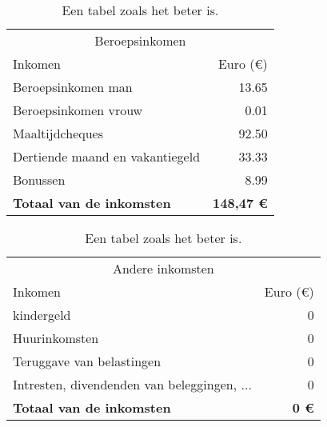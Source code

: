\begin{comment}
		&                                                                      \\ \hline
		\textbf{Totaal van de inkomsten}              & \textbf{1535 \euro{}}   \\ %
		
		
	\end{tabular}
	\caption{budget}
	\label{tab:budgetoverzicht}
\end{table}

\end{comment}

\begin{table}[!htbp]
	\centering
	\begin{tabular}{@{}lr@{}} \toprule
		\multicolumn{2}{c}{Beroepsinkomen} \\ \cmidrule(r){1-2}
		Inkomen    										& Euro (\euro{})\\ \midrule
		Beroepsinkomen man      						& 13.65 \\
		Beroepsinkomen vrouw    						& 0.01 \\
		Maaltijdcheques       							& 92.50 \\
		Dertiende maand en vakantiegeld  				& 33.33 \\
		Bonussen 										& 8.99 \\
		\textbf{Totaal van de inkomsten}              	& \textbf{148,47 \euro{}}   \\ \bottomrule
	\end{tabular}
	\caption{Een tabel zoals het beter is.}
	\label{tab:juist}
\end{table}

\begin{table}[!htbp]
	\centering
	\begin{tabular}{@{}lr@{}} \toprule
		\multicolumn{2}{c}{Andere inkomsten} \\ \cmidrule(r){1-2}
		Inkomen    										& Euro (\euro{})\\ \midrule
		kindergeld      								& 0 \\
		Huurinkomsten    								& 0 \\
		Teruggave van belastingen       				& 0 \\
		Intresten, divendenden van beleggingen, ...  	& 0 \\
		\textbf{Totaal van de inkomsten}              	& \textbf{0 \euro{}}   \\ \bottomrule
	\end{tabular}
	\caption{Een tabel zoals het beter is.}
	\label{tab:juist}
\end{table}


